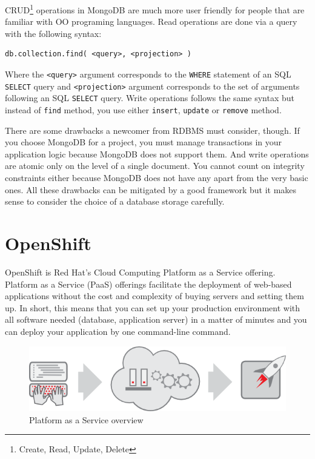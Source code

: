 CRUD\footnote{Create, Read, Update, Delete} operations in MongoDB are much more user friendly for people that are familiar with OO programing languages. Read operations are done via a query with the following syntax:

\begin{verbatim}
db.collection.find( <query>, <projection> )
\end{verbatim}

Where the \texttt{<query>} argument corresponds to the \texttt{WHERE} statement of an SQL \texttt{SELECT} query and \texttt{<projection>} argument corresponds to the set of arguments following an SQL \texttt{SELECT} query. Write operations follows the same syntax but instead of \texttt{find} method, you use either \texttt{insert}, \texttt{update} or \texttt{remove} method.

There are some drawbacks a newcomer from RDBMS must consider, though. If you choose MongoDB for a project, you must manage transactions in your application logic because MongoDB does not support them. And write operations are atomic only on the level of a single document. You cannot count on integrity constraints either because MongoDB does not have any apart from the very basic ones. All these drawbacks can be mitigated by a good framework but it makes sense to consider the choice of a database storage carefully.

\section{OpenShift}

OpenShift is Red Hat's Cloud Computing Platform as a Service offering\cite{openshift-homepage}. Platform as a Service (PaaS) offerings facilitate the deployment of web-based applications without the cost and complexity of buying servers and setting them up\cite{guardian-google-paas}. In short, this means that you can set up your production environment with all software needed (database, application server) in a matter of minutes and you can deploy your application by one command-line command.

\begin{figure}[htbp]
    \centering
        \includegraphics[scale=0.5]{./images/overview-paas.png}
    \caption{Platform as a Service overview}
    \label{fig:overview-paas}
\end{figure}

